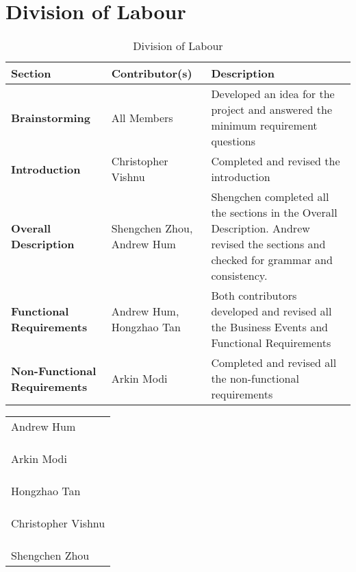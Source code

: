 \documentclass[]{article}
\begin{document}
\section{Division of Labour}
\label{sec:division_of_labour}
\begin{table}[H]
    \centering
    \caption{Division of Labour}
    \begin{tabular}{|p{2.5cm}|p{2.5cm}|p{10.5cm}|}
        \hline
        \textbf{Section} & \textbf{Contributor(s)} & \textbf{Description}\\
        \hline
        \textbf{Brainstorming} & All Members & Developed an idea for the project 
        and answered the minimum requirement questions\\
        \hline
        \textbf{Introduction} & Christopher Vishnu & Completed and revised 
        the introduction\\
        \hline
        \textbf{Overall Description} & Shengchen Zhou, Andrew Hum & Shengchen 
        completed all the sections in the Overall Description. Andrew revised 
        the sections and checked for grammar and consistency.\\
        \hline
        \textbf{Functional Requirements} & Andrew Hum, Hongzhao Tan & Both 
        contributors developed and revised all the Business Events and 
        Functional Requirements\\
        \hline
        \textbf{Non-Functional Requirements} & Arkin Modi & Completed and 
        revised all the non-functional requirements\\
        \hline
    \end{tabular}
\end{table}

\vspace{2cm}

\begin{table}[H]
    \begin{tabular}{p{5cm}}
    \\
    \hline
    Andrew Hum
    \\\\\\\\
    \hline
    Arkin Modi
    \\\\\\\\
    \hline
    Hongzhao Tan
    \\\\\\\\
    \hline
    Christopher Vishnu
    \\\\\\\\
    \hline
    Shengchen Zhou
    \end{tabular}
\end{table}
\end{document}
